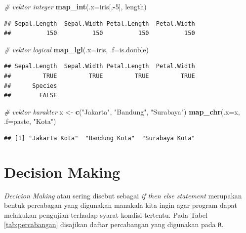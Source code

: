 \documentclass[]{book}
\newenvironment{Shaded}{\begin{snugshade}}{\end{snugshade}}
\newcommand{\KeywordTok}[1]{\textcolor[rgb]{0.13,0.29,0.53}{\textbf{#1}}}
\newcommand{\DataTypeTok}[1]{\textcolor[rgb]{0.13,0.29,0.53}{#1}}
\newcommand{\DecValTok}[1]{\textcolor[rgb]{0.00,0.00,0.81}{#1}}
\newcommand{\StringTok}[1]{\textcolor[rgb]{0.31,0.60,0.02}{#1}}
\newcommand{\CommentTok}[1]{\textcolor[rgb]{0.56,0.35,0.01}{\textit{#1}}}
\newcommand{\OperatorTok}[1]{\textcolor[rgb]{0.81,0.36,0.00}{\textbf{#1}}}
\newcommand{\NormalTok}[1]{#1}
\begin{document}
\begin{Shaded}
\begin{Highlighting}[]
\CommentTok{# vektor integer}
\KeywordTok{map_int}\NormalTok{(}\DataTypeTok{.x=}\NormalTok{iris[,}\OperatorTok{-}\DecValTok{5}\NormalTok{], length)}
\end{Highlighting}
\end{Shaded}

\begin{verbatim}
## Sepal.Length  Sepal.Width Petal.Length  Petal.Width 
##          150          150          150          150
\end{verbatim}

\begin{Shaded}
\begin{Highlighting}[]
\CommentTok{# vektor logical}
\KeywordTok{map_lgl}\NormalTok{(}\DataTypeTok{.x=}\NormalTok{iris, }\DataTypeTok{.f=}\NormalTok{is.double)}
\end{Highlighting}
\end{Shaded}

\begin{verbatim}
## Sepal.Length  Sepal.Width Petal.Length  Petal.Width 
##         TRUE         TRUE         TRUE         TRUE 
##      Species 
##        FALSE
\end{verbatim}

\begin{Shaded}
\begin{Highlighting}[]
\CommentTok{# vektor karakter}
\NormalTok{x <-}\StringTok{ }\KeywordTok{c}\NormalTok{(}\StringTok{"Jakarta"}\NormalTok{, }\StringTok{"Bandung"}\NormalTok{, }\StringTok{"Surabaya"}\NormalTok{)}
\KeywordTok{map_chr}\NormalTok{(}\DataTypeTok{.x=}\NormalTok{x, }\DataTypeTok{.f=}\NormalTok{paste, }\StringTok{"Kota"}\NormalTok{)}
\end{Highlighting}
\end{Shaded}

\begin{verbatim}
## [1] "Jakarta Kota"  "Bandung Kota"  "Surabaya Kota"
\end{verbatim}

\section{Decision Making}\label{decision-making}

\emph{Decicion Making} atau sering disebut sebagai \emph{if then else
statement} merupakan bentuk percabagan yang digunakan manakala kita
ingin agar program dapat melakukan pengujian terhadap syarat kondisi
tertentu. Pada Tabel \ref{tab:percabangan} disajikan daftar percabangan
yang digunakan pada \texttt{R}.
\end{document}
